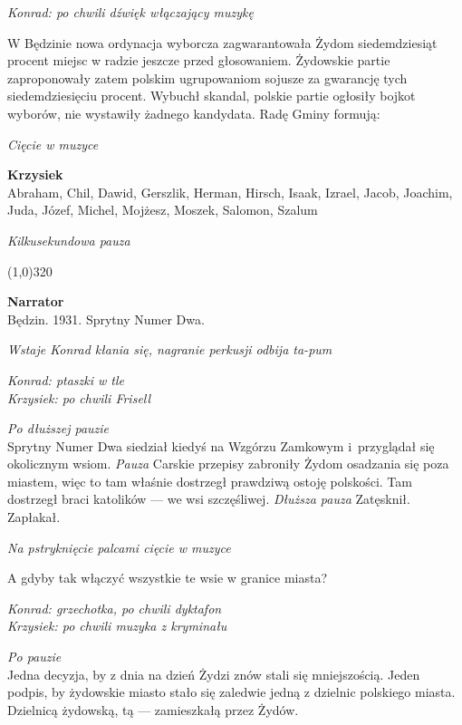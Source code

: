 \documentclass[11pt,a4paper,oneside]{article}
\begin{document}
{\color{konrad} \emph{Konrad: po chwili dźwięk włączający muzykę}}

W Będzinie nowa ordynacja wyborcza zagwarantowała Żydom siedemdziesiąt
procent miejsc w radzie jeszcze przed głosowaniem. Żydowskie partie %
zaproponowały zatem polskim ugrupowaniom sojusze za gwarancję tych
siedemdziesięciu procent. Wybuchł skandal, polskie partie ogłosiły
bojkot wyborów, nie wystawiły żadnego kandydata. Radę Gminy formują:

{\color{light-gray} \emph{Cięcie w muzyce}}

{\color{krzysiek}
\textbf{Krzysiek}\\
Abraham, Chil, Dawid, Gerszlik, Herman, Hirsch, Isaak, Izrael, Jacob,
Joachim, Juda, Józef, Michel, Mojżesz, Moszek, Salomon, Szalum
}

{\color{light-gray} \emph{Kilkusekundowa pauza}}

\line(1,0){320}

 
\textbf{Narrator}\\
Będzin. 1931. Sprytny Numer Dwa. 

{\color{light-gray} \emph{Wstaje Konrad kłania się, nagranie perkusji odbija
ta-pum}}

{\color{konrad}   \emph{Konrad: ptaszki w tle}}\\
{\color{krzysiek} \emph{Krzysiek: po chwili Frisell}}

{\color{light-gray} \emph{Po dłuższej pauzie}}\\
Sprytny Numer Dwa siedział kiedyś na Wzgórzu Zamkowym i~przyglądał się
okolicznym wsiom. {\color{light-gray} \emph{Pauza}} Carskie przepisy
zabroniły Żydom osadzania się poza miastem, więc to tam właśnie
dostrzegł prawdziwą ostoję polskości. Tam dostrzegł braci katolików
--- we wsi szczęśliwej.  {\color{light-gray} \emph{Dłuższa pauza}}
Zatęsknił. Zapłakał.

{\color{light-gray} \emph{Na pstryknięcie palcami cięcie w muzyce}}

A gdyby tak włączyć wszystkie te wsie w granice miasta?

{\color{konrad}   \emph{Konrad: grzechotka, po chwili dyktafon}}\\
{\color{krzysiek} \emph{Krzysiek: po chwili muzyka z kryminału}}

{\color{light-gray} \emph{Po pauzie}}\\
Jedna decyzja, by z dnia na dzień Żydzi znów stali się mniejszością.
Jeden podpis, by żydowskie miasto stało się zaledwie jedną z dzielnic
polskiego miasta.  Dzielnicą żydowską, tą --- zamieszkałą przez Żydów. 
\end{document}
